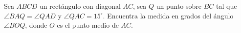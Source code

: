 Sea $ABCD$ un rectángulo con diagonal $AC$, sea $Q$ un punto sobre $BC$ tal que $\angle BAQ = \angle QAD$ y $\angle QAC = 15^\circ$. Encuentra la medida en grados del ángulo $\angle BOQ$, donde $O$ es el punto medio de $AC$.